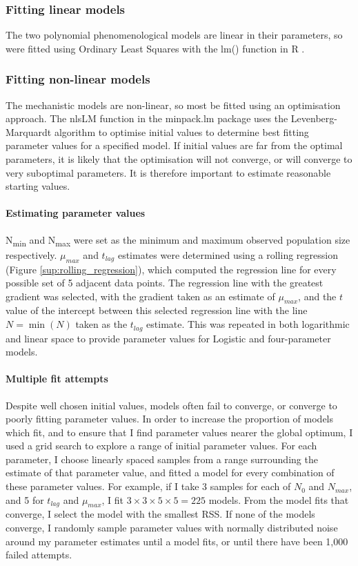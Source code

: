 \documentclass[11pt, a4paper]{article}
\begin{document}
\begin{linenumbers}
\subsubsection{Fitting linear models}

The two polynomial phenomenological models are linear in their parameters, so were fitted using Ordinary Least Squares with the lm() function in R \cite{R}.

\subsubsection{Fitting non-linear models}

The mechanistic models are non-linear, so most be fitted using an optimisation approach. The nlsLM function in the minpack.lm \cite{minpack} package uses the Levenberg-Marquardt algorithm to optimise initial values to determine best fitting parameter values for a specified model. If initial values are far from the optimal parameters, it is likely that the optimisation will not converge, or will converge to very suboptimal parameters. It is therefore important to estimate reasonable starting values.

\paragraph{Estimating parameter values}
N\textsubscript{min} and N\textsubscript{max} were set as the minimum and maximum observed population size respectively. $\mu_{max}$ and $t_{lag}$ estimates were determined using a rolling regression (Figure \ref{sup:rolling_regression}), which computed the regression line for every possible set of 5 adjacent data points. The regression line with the greatest gradient was selected, with the gradient taken as an estimate of $\mu_{max}$, and the $t$ value of the intercept between this selected regression line with the line $N = \min(N)$ taken as the $t_{lag}$ estimate. This was repeated in both logarithmic and linear space to provide parameter values for Logistic and four-parameter models.


\paragraph{Multiple fit attempts}
Despite well chosen initial values, models often fail to converge, or converge to poorly fitting parameter values. In order to increase the proportion of models which fit, and to ensure that I find parameter values nearer the global optimum, I used a grid search to explore a range of initial parameter values. For each parameter, I choose linearly spaced samples from a range surrounding the estimate of that parameter value, and fitted a model for every combination of these parameter values. For example, if I take 3 samples for each of $N_0$ and $N_{max}$, and 5 for $t_{lag}$ and $\mu_{max}$, I fit $3 \times 3 \times 5 \times 5 = 225$ models. From the model fits that converge, I select the model with the smallest RSS. If none of the models converge, I randomly sample parameter values with normally distributed noise around my parameter estimates until a model fits, or until there have been 1,000 failed attempts. 


\end{linenumbers}
\end{document}
